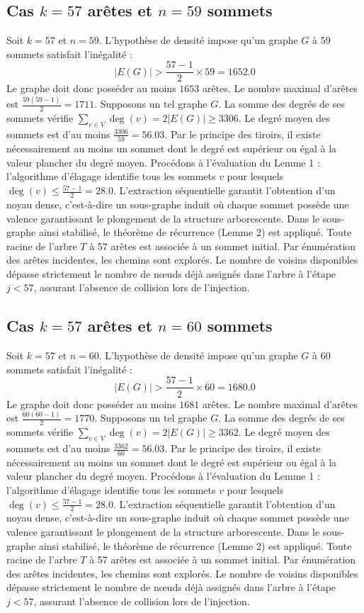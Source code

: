 \documentclass[12pt,a4paper]{article}
\begin{document}
\subsection{Cas $k = 57$ arêtes et $n = 59$ sommets}
Soit $k = 57$ et $n = 59$. L'hypothèse de densité impose qu'un graphe $G$ à 59 sommets satisfait l'inégalité :
$$ |E(G)| > \frac{57-1}{2} \times 59 = 1652.0 $$
Le graphe doit donc posséder au moins $1653$ arêtes. Le nombre maximal d'arêtes est $\frac{59(59-1)}{2} = 1711$.
Supposons un tel graphe $G$. La somme des degrés de ses sommets vérifie $\sum_{v \in V} \deg(v) = 2|E(G)| \geq 3306$.
Le degré moyen des sommets est d'au moins $\frac{3306}{59} = 56.03$.
Par le principe des tiroirs, il existe nécessairement au moins un sommet dont le degré est supérieur ou égal à la valeur plancher du degré moyen.
Procédons à l'évaluation du Lemme 1 : l'algorithme d'élagage identifie tous les sommets $v$ pour lesquels $\deg(v) \leq \frac{57-1}{2} = 28.0$.
L'extraction séquentielle garantit l'obtention d'un noyau dense, c'est-à-dire un sous-graphe induit où chaque sommet possède une valence garantissant le plongement de la structure arborescente.
Dans le sous-graphe ainsi stabilisé, le théorème de récurrence (Lemme 2) est appliqué. Toute racine de l'arbre $T$ à 57 arêtes est associée à un sommet initial. Par énumération des arêtes incidentes, les chemins sont explorés. Le nombre de voisins disponibles dépasse strictement le nombre de nœuds déjà assignés dans l'arbre à l'étape $j < 57$, assurant l'absence de collision lors de l'injection.

\subsection{Cas $k = 57$ arêtes et $n = 60$ sommets}
Soit $k = 57$ et $n = 60$. L'hypothèse de densité impose qu'un graphe $G$ à 60 sommets satisfait l'inégalité :
$$ |E(G)| > \frac{57-1}{2} \times 60 = 1680.0 $$
Le graphe doit donc posséder au moins $1681$ arêtes. Le nombre maximal d'arêtes est $\frac{60(60-1)}{2} = 1770$.
Supposons un tel graphe $G$. La somme des degrés de ses sommets vérifie $\sum_{v \in V} \deg(v) = 2|E(G)| \geq 3362$.
Le degré moyen des sommets est d'au moins $\frac{3362}{60} = 56.03$.
Par le principe des tiroirs, il existe nécessairement au moins un sommet dont le degré est supérieur ou égal à la valeur plancher du degré moyen.
Procédons à l'évaluation du Lemme 1 : l'algorithme d'élagage identifie tous les sommets $v$ pour lesquels $\deg(v) \leq \frac{57-1}{2} = 28.0$.
L'extraction séquentielle garantit l'obtention d'un noyau dense, c'est-à-dire un sous-graphe induit où chaque sommet possède une valence garantissant le plongement de la structure arborescente.
Dans le sous-graphe ainsi stabilisé, le théorème de récurrence (Lemme 2) est appliqué. Toute racine de l'arbre $T$ à 57 arêtes est associée à un sommet initial. Par énumération des arêtes incidentes, les chemins sont explorés. Le nombre de voisins disponibles dépasse strictement le nombre de nœuds déjà assignés dans l'arbre à l'étape $j < 57$, assurant l'absence de collision lors de l'injection.
\end{document}
